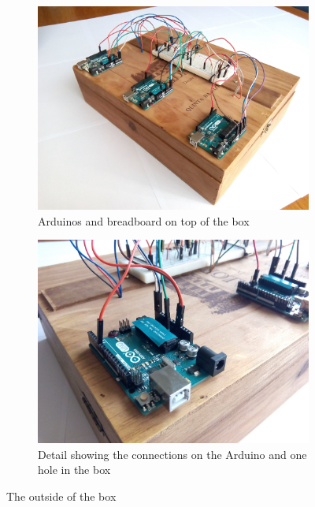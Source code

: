 \begin{figure}[h]
    \centering
    \begin{subfigure}[t]{0.49\textwidth}
        \centering
        \includegraphics[width=\textwidth]{img/setup_box_closed}
        \caption{Arduinos and breadboard on top of the box}
        \label{fig:setup_box_closed}
    \end{subfigure}
    \begin{subfigure}[t]{0.49\textwidth}
        \centering
        \includegraphics[width=\textwidth]{img/setup_arduino_connections}
        \caption{Detail showing the connections on the Arduino and one hole in the box}
        \label{fig:setup_arduino_connections}
    \end{subfigure}
    \caption{The outside of the box}
    \label{fig:setup_box_outside}
\end{figure}


